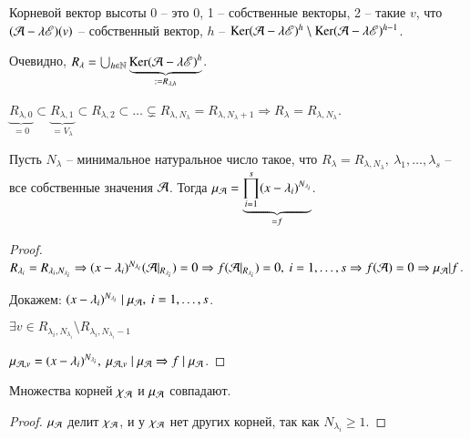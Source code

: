 \documentclass[main]{subfiles}
\begin{document}
Корневой вектор высоты 0 -- это 0, 1 -- собственные векторы, 2 -- такие $v$, что $(\mathcal{A} - \lambda \mathscr{E})(v)$ -- собственный вектор,
$h$ -- $\operatorname{Ker}(\mathcal{A} - \lambda \mathscr{E})^h \setminus \operatorname{Ker}(\mathcal{A} - \lambda \mathscr{E})^{h-1}$.

Очевидно, $R_{\lambda} = \bigcup_{h \in \mathbb{N}} \underbrace{\operatorname{Ker}(\mathcal{A} - \lambda \mathscr{E})^h}_{:= R_{\lambda, h}}$.

$\underbrace{R_{\lambda, 0}}_{=0} \subset \underbrace{R_{\lambda, 1}}_{= V_{\lambda}} \subset R_{\lambda, 2} \subset \ldots \subsetneq  R_{\lambda, N_{\lambda}} = R_{\lambda, N_{\lambda} + 1} \Rightarrow
  R_{\lambda} = R_{\lambda, N_{\lambda}}$.

\begin{proposition}
  Пусть $N_{\lambda}$ -- минимальное натуральное число такое, что $R_{\lambda} = R_{\lambda, N_{\lambda}}, \ \lambda_1, \ldots, \lambda_s$ -- все собственные значения $\mathcal{A}$.
  Тогда ${\mu}_{\mathcal{A}} = \underbrace{\prod_{i = 1}^s(x-\lambda_i)^{N_{\lambda_i}}}_{=f}$.
\end{proposition}

\begin{proof}
  $R_{\lambda_i} = R_{\lambda_i, N_{\lambda_i}} \Rightarrow (x - \lambda_i)^{N_{\lambda_i}}(\mathcal{A}|_{R_{\lambda_i}}) = 0 \Rightarrow
    f(\mathcal{A}|_{R_{\lambda_i}}) = 0, \ i = 1, \ldots, s \Rightarrow f(\mathcal{A}) = 0 \Rightarrow \mu_{\mathcal{A}} | f$.

  Докажем: $(x - \lambda_i)^{N_{\lambda_i}} \mid \mu_{\mathcal{A}}, \ i = 1, \ldots, s$.

  $\exists v \in R_{\lambda_i, N_{\lambda_i}}\setminus R_{\lambda_i, N_{\lambda_i} - 1}$

  $\mu_{\mathcal{A}, v} = (x - \lambda_i)^{N_{\lambda_i}}, \ \mu_{\mathcal{A}, v} \mid \mu_{\mathcal{A}} \Rightarrow f \mid \mu_{\mathcal{A}}$.
\end{proof}

\begin{corollary}
  Множества корней $\chi_{\mathcal{A}}$ и $\mu_{\mathcal{A}}$ совпадают.
\end{corollary}

\begin{proof}
  $\mu_{\mathcal{A}}$ делит $\chi_{\mathcal{A}}$, и у $\chi_{\mathcal{A}}$ нет других корней, так как $N_{\lambda_i} \geq  1$.
\end{proof}
\end{document}
